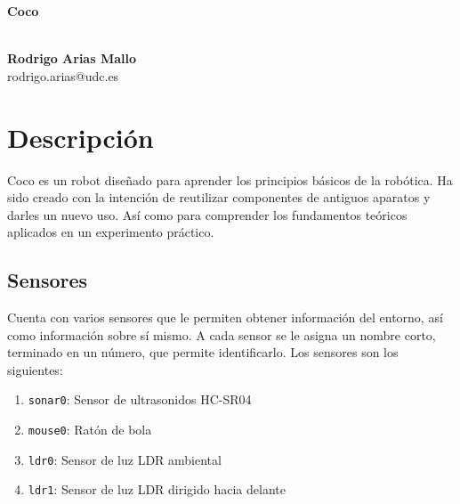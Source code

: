\documentclass[10pt,a4paper,hidelinks,twocolumn]{article}
\begin{document}
\begin{center}
\begin{huge}
\textbf{Coco}
\end{huge}
\\[10pt]
\textbf{Rodrigo Arias Mallo}\\
rodrigo.arias@udc.es
\end{center}

\newcommand\RobotAngle{45}
\newcommand\RobotSize{2}
\newcommand\RobotRadius{4}
\newcommand\RobotThetaSonar{60.0}


\section{Descripción}
Coco es un robot diseñado para aprender los principios básicos de la robótica.
Ha sido creado con la intención de reutilizar componentes de antiguos aparatos y 
darles un nuevo uso. Así como para comprender los fundamentos teóricos
aplicados en un experimento práctico.

\subsection{Sensores}
Cuenta con varios sensores que le permiten obtener información del entorno, así
como información sobre sí mismo. A cada sensor se le asigna un nombre corto, 
terminado en un número, que permite identificarlo. Los sensores son los 
siguientes:

\begin{enumerate}
	\setlength{\parskip}{0cm}

	\item \texttt{sonar0}: Sensor de ultrasonidos HC-SR04
	\item \texttt{mouse0}: Ratón de bola
	\item \texttt{ldr0}: Sensor de luz LDR ambiental
	\item \texttt{ldr1}: Sensor de luz LDR dirigido hacia delante
\end{enumerate}

\end{document}
